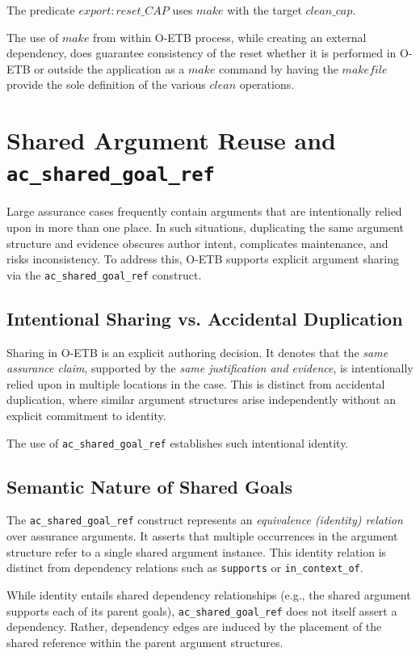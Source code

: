 \documentclass[12pt,twoside,a4paper]{article}
\begin{document}
The predicate $export:reset\_CAP$  uses $make$ with the target $clean\_cap$.

The use of $make$ from within O-ETB process, while creating an external dependency, does guarantee consistency of the reset whether it is performed in O-ETB or outside the application as a $make$ command by having the $makefile$ provide the sole definition of the various $clean$ operations.


\section{Shared Argument Reuse and \texttt{ac\_shared\_goal\_ref}}

Large assurance cases frequently contain arguments that are intentionally relied upon in more than one place. In such situations, duplicating the same argument structure and evidence obscures author intent, complicates maintenance, and risks inconsistency. To address this, O-ETB supports explicit argument sharing via the \texttt{ac\_shared\_goal\_ref} construct.

\subsection{Intentional Sharing vs. Accidental Duplication}

Sharing in O-ETB is an explicit authoring decision. It denotes that the \emph{same assurance claim}, supported by the \emph{same justification and evidence}, is intentionally relied upon in multiple locations in the case. This is distinct from accidental duplication, where similar argument structures arise independently without an explicit commitment to identity.

The use of \texttt{ac\_shared\_goal\_ref} establishes such intentional identity.

\subsection{Semantic Nature of Shared Goals}

The \texttt{ac\_shared\_goal\_ref} construct represents an \emph{equivalence (identity) relation} over assurance arguments. It asserts that multiple occurrences in the argument structure refer to a single shared argument instance. This identity relation is distinct from dependency relations such as \texttt{supports} or \texttt{in\_context\_of}.

While identity entails shared dependency relationships (e.g., the shared argument supports each of its parent goals), \texttt{ac\_shared\_goal\_ref} does not itself assert a dependency. Rather, dependency edges are induced by the placement of the shared reference within the parent argument structures.
\end{document}

